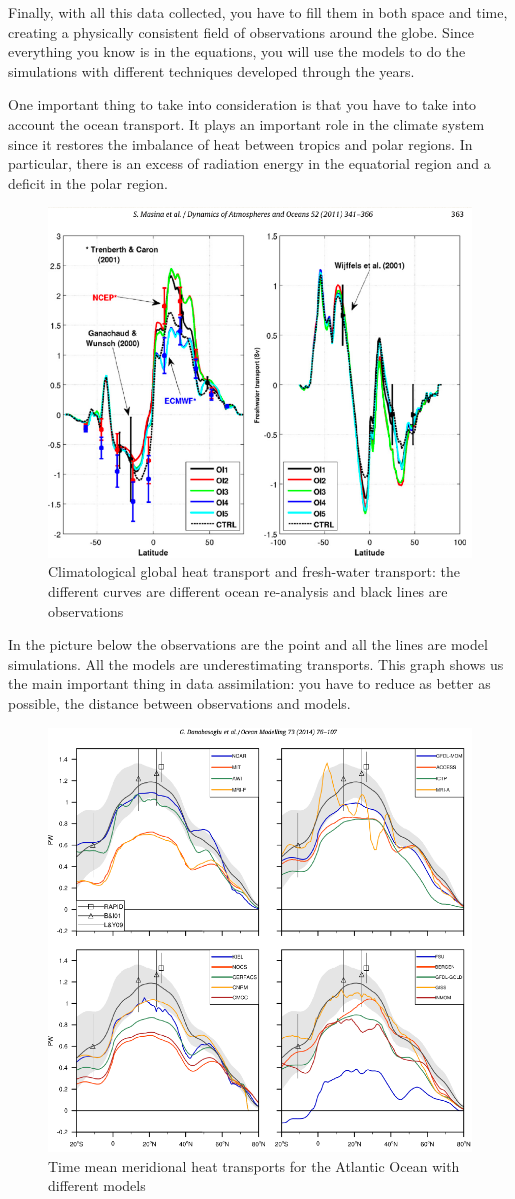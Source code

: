 Finally, with all this data collected, you have to fill them in both space and time, creating a physically consistent field of observations around the globe. Since everything you know is in the equations, you will use the models to do the simulations with different techniques developed through the years.

One important thing to take into consideration is that you have to take into account the ocean transport. It plays an important role in the climate system since it restores the imbalance of heat between tropics and polar regions. In particular, there is an excess of radiation energy in the equatorial region and a deficit in the polar region.

\begin{figure}[htp!]
	\centering
	\includegraphics[width=0.4\linewidth]{uploads/image8.png}
	\caption{Climatological global heat transport and fresh-water transport: the different curves are different ocean re-analysis and black lines are observations}
	\label{fig:enter-label}
\end{figure}

In the picture below the observations are the point and all the lines are model simulations. All the models are underestimating transports.
This graph shows us the main important thing in data assimilation: you have to reduce as better as possible, the distance between observations and models.
\begin{figure}[htp!]
	\centering
	\includegraphics[width=0.4\linewidth]{uploads/image9.png}
	\caption{Time mean meridional heat transports for the Atlantic Ocean with different models}
	\label{fig:enter-label}
\end{figure}

